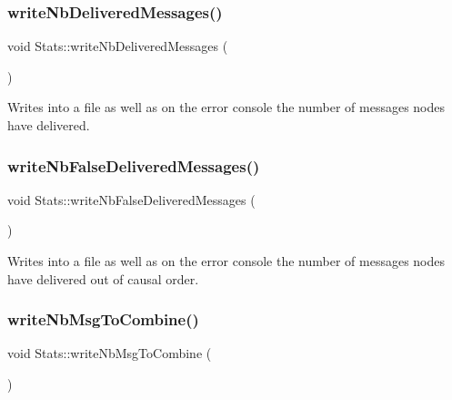 \subsubsection{\texorpdfstring{write\+Nb\+Delivered\+Messages()}{writeNbDeliveredMessages()}}
{\footnotesize\ttfamily void Stats\+::write\+Nb\+Delivered\+Messages (\begin{DoxyParamCaption}{ }\end{DoxyParamCaption})\hspace{0.3cm}{\ttfamily [private]}}



Writes into a file as well as on the error console the number of messages nodes have delivered. 

\mbox{\label{class_stats_a45fda4fde87dda93eaa44357d077d48c}} 
\subsubsection{\texorpdfstring{write\+Nb\+False\+Delivered\+Messages()}{writeNbFalseDeliveredMessages()}}
{\footnotesize\ttfamily void Stats\+::write\+Nb\+False\+Delivered\+Messages (\begin{DoxyParamCaption}{ }\end{DoxyParamCaption})\hspace{0.3cm}{\ttfamily [private]}}



Writes into a file as well as on the error console the number of messages nodes have delivered out of causal order. 

\mbox{\label{class_stats_ae91ab66504445b9e703966b505a55eaa}} 
\subsubsection{\texorpdfstring{write\+Nb\+Msg\+To\+Combine()}{writeNbMsgToCombine()}}
{\footnotesize\ttfamily void Stats\+::write\+Nb\+Msg\+To\+Combine (\begin{DoxyParamCaption}{ }\end{DoxyParamCaption})\hspace{0.3cm}{\ttfamily [private]}}



